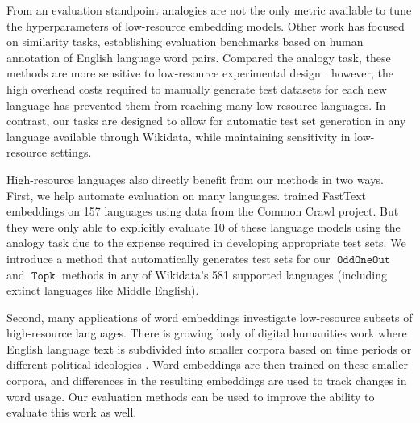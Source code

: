 \documentclass[11pt,a4paper]{article}
\DeclareMathOperator{\OddOneOut}{\texttt{OddOneOut}}
\DeclareMathOperator{\topk}{\texttt{Topk}}
\begin{document}
From an evaluation standpoint analogies are not the only metric available to tune the hyperparameters of low-resource embedding models.
Other work has focused on similarity tasks, establishing evaluation benchmarks based on human annotation of English language word pairs.
 Compared the analogy task,
 these methods are more sensitive to low-resource experimental design \cite{finkelstein2001placing,radinsky2011word,bruni2012distributional}.
however, the high overhead costs required to manually generate test datasets for each new language has prevented them from reaching many low-resource languages. In contrast, our tasks are designed to allow for automatic test set generation in any language available through Wikidata, while maintaining sensitivity in low-resource settings.


High-resource languages also directly benefit from our methods in two ways.
First, we help automate evaluation on many languages.
\citet{grave2018learning} trained FastText embeddings on 157 languages using data from the Common Crawl project.
But they were only able to explicitly evaluate 10 of these language models using the analogy task due to the expense required in developing appropriate test sets.
We introduce a method that automatically generates test sets for our $\OddOneOut$ and $\topk$ methods in any of Wikidata's 581 supported languages (including extinct languages like Middle English).%

Second, many applications of word embeddings investigate low-resource subsets of high-resource languages.
There is growing body of digital humanities work where English language text is subdivided into smaller corpora based on time periods \cite[e.g.][]{kulkarni2015statistically,hamilton2016diachronic,hamilton2016cultural,dubossarsky2017outta,szymanski2017temporal,chen2017understanding,liang2018dynamic,tang2018state,kutuzov2018diachronic,kozlowski2019geometry}
or different political ideologies \citet{azarbonyad2017words}.
Word embeddings are then trained on these smaller corpora,
and differences in the resulting embeddings are used to track changes in word usage.
Our evaluation methods can be used to improve the ability to evaluate this work as well.
\end{document}
